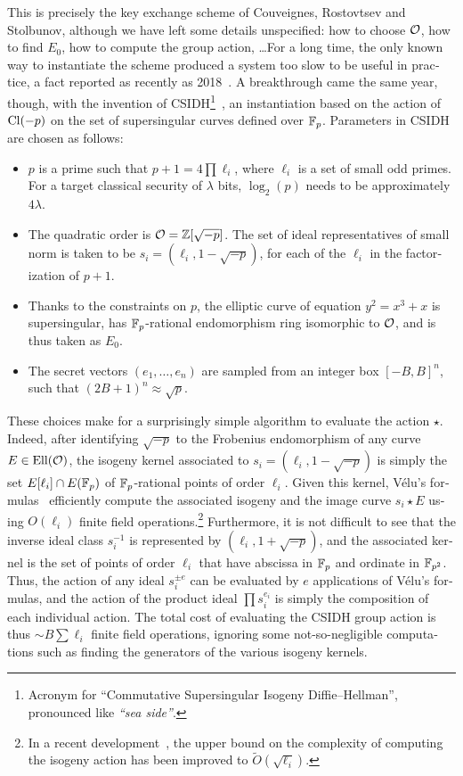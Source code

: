 \begin{otherlanguage}{english}
  This is precisely the key exchange scheme of Couveignes, Rostovtsev
  and Stolbunov, although we have left some details unspecified: how
  to choose $\mathcal{O}$, how to find $E_0$, how to compute the group action,
  \dots For a long time, the only known way to instantiate the scheme
  produced a system too slow to be useful in practice, a fact reported
  as recently as 2018~\cite{AC:DeFKieSmi18}. A breakthrough came the
  same year, though, with the invention of CSIDH\footnote{Acronym for
    ``Commutative Supersingular Isogeny Diffie--Hellman'', pronounced
    like \emph{``sea side''}.}~\cite{AC:CLMPR18}, an
  instantiation based on the action of $\mathrm{Cl}(-p)$ on the set of
  supersingular curves defined over $\mathbb{F}_p$. Parameters in CSIDH are
  chosen as follows:
  \begin{itemize}
  \item $p$ is a prime such that $p+1=4\prod \ell_i$, where $\ell_i$
    is a set of small odd primes. For a target classical security of
    $\lambda$ bits, $\log_2(p)$ needs to be approximately $4\lambda$.
  \item The quadratic order is $\mathcal{O}=\mathbb{Z}[\sqrt{-p}]$.  The set of ideal
    representatives of small norm is taken to be
    $s_i=(\ell_i,1-\sqrt{-p})$, for each of the $\ell_i$ in the
    factorization of $p+1$.
  \item Thanks to the constraints on $p$, the elliptic curve of
    equation $y^2=x^3+x$ is supersingular, has $\mathbb{F}_p$-rational
    endomorphism ring isomorphic to $\mathcal{O}$, and is thus taken as
    $E_0$.
  \item The secret vectors $(e_1,\ldots,e_n)$ are sampled from an integer box
    $[-B,B]^n$, such that $(2B+1)^n\approx\sqrt{p}$.
  \end{itemize}
  
  These choices make for a surprisingly simple algorithm to evaluate
  the action $\star$. Indeed, after identifying $\sqrt{-p}$ to the
  Frobenius endomorphism of any curve $E\in\mathrm{Ell}(\mathcal{O})$, the isogeny
  kernel associated to $s_i=(\ell_i,1-\sqrt{-p})$ is simply the set
  $E[\ell_i]\cap E(\mathbb{F}_p)$ of $\mathbb{F}_p$-rational points of order
  $\ell_i$. Given this kernel, Vélu's
  formulas~\cite{velu71,moody2016analogues,PQCRYPTO:Renes18}
  efficiently compute the associated isogeny and the image curve
  $s_i\star E$ using $O(\ell_i)$ finite field operations.\footnote{In
    a recent development~\cite{bernstein2020faster}, the upper bound
    on the complexity of computing the isogeny action has been
    improved to $\tilde{O}(\sqrt{\ell_i})$.}  Furthermore, it is not
  difficult to see that the inverse ideal class $s_i^{-1}$ is
  represented by $(\ell_i,1+\sqrt{-p})$, and the associated kernel is
  the set of points of order $\ell_i$ that have abscissa in $\mathbb{F}_p$ and
  ordinate in $\mathbb{F}_{p^2}$. Thus, the action of any ideal $s_i^{\pm e}$
  can be evaluated by $e$ applications of Vélu's formulas, and the
  action of the product ideal $\prod s_i^{e_i}$ is simply the
  composition of each individual action.  The total cost of evaluating
  the CSIDH group action is thus $\sim B\sum\ell_i$ finite field
  operations, ignoring some not-so-negligible computations such as
  finding the generators of the various isogeny kernels.


\end{otherlanguage}
